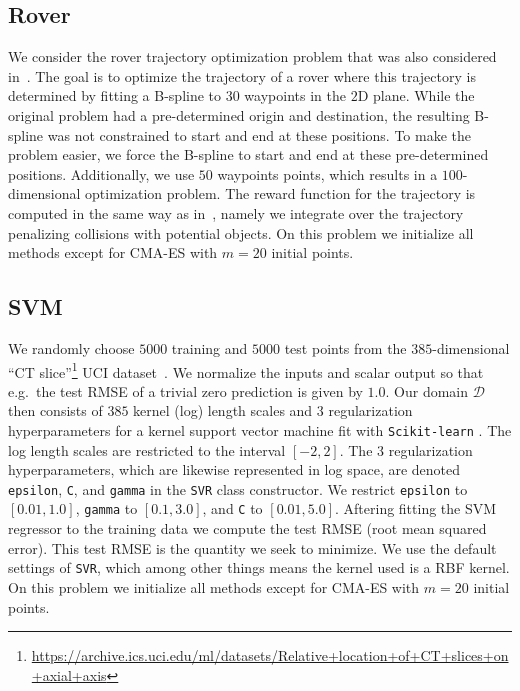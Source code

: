 \documentclass[accepted]{uai2021} %
\newcommand{\DD}{\mathcal{D}}
\begin{document}
\subsection{Rover}
We consider the rover trajectory optimization problem that was also considered in~\citet{wang2018batched}.
The goal is to optimize the trajectory of a rover where this trajectory is determined by fitting a B-spline to $30$ waypoints in the $2$D plane.
While the original problem had a pre-determined origin and destination, the resulting B-spline was not constrained to start and end at these positions.
To make the problem easier, we force the B-spline to start and end at these pre-determined positions.
Additionally, we use $50$ waypoints points, which results in a $100$-dimensional optimization problem.
The reward function for the trajectory is computed in the same way as in~\citet{wang2018batched},
namely we integrate over the trajectory penalizing collisions with potential objects.
On this problem we initialize all methods except for CMA-ES with $m=20$ initial points.


\subsection{SVM}
We randomly choose $5000$ training and $5000$ test points
from the $385$-dimensional ``CT slice''\footnote{\url{https://archive.ics.uci.edu/ml/datasets/Relative+location+of+CT+slices+on+axial+axis}} UCI dataset~\citep{dua2019uci}.
We normalize the inputs and scalar output so that e.g.~the test RMSE of a trivial
zero prediction is given by $1.0$.
Our domain $\DD$ then consists of $385$ kernel (log) length scales and $3$ regularization hyperparameters
for a kernel support vector machine fit with \texttt{Scikit-learn} \citep{pedregosa2011scikit}. The log length scales
are restricted to the interval $[-2, 2]$. The 3 regularization hyperparameters,
which are likewise represented in log space,
are denoted \texttt{epsilon}, \texttt{C}, and \texttt{gamma} in the \texttt{SVR} class constructor. We restrict \texttt{epsilon} to $[0.01, 1.0]$, \texttt{gamma} to $[0.1, 3.0]$,
and \texttt{C} to $[0.01, 5.0]$. Aftering fitting the SVM regressor to the training
data we compute the test RMSE (root mean squared error). This test RMSE is the quantity
we seek to minimize. We use the default settings of \texttt{SVR}, which among other things
means the kernel used is a RBF kernel.
On this problem we initialize all methods except for CMA-ES with $m=20$ initial points.
\end{document}
